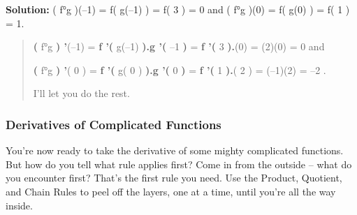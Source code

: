 \textbf{Solution:} ( f°g )(--1) = f( g(--1) ) = f( 3 ) = 0 and ( f°g
)(0) = f( g(0) ) = f( 1 ) = 1.

\begin{quote}
\textbf{(} f°g \textbf{) '}(--1) = \textbf{f '(} g(--1) \textbf{).g '(}
--1 \textbf{)} = \textbf{f '(} 3 \textbf{).}(0) = (2)(0) = 0 and

\textbf{(} f°g \textbf{) '}( 0 ) = \textbf{f '(} g( 0 ) \textbf{).g '(}
0 \textbf{)} = \textbf{f '(} 1 \textbf{).}( 2 ) = (--1)(2) = --2 .

I'll let you do the rest.
\end{quote}

\subsubsection{Derivatives of Complicated
Functions}\label{derivatives-of-complicated-functions}

You're now ready to take the derivative of some mighty complicated
functions. But how do you tell what rule applies first? Come in from the
outside -- what do you encounter first? That's the first rule you need.
Use the Product, Quotient, and Chain Rules to peel off the layers, one
at a time, until you're all the way inside.

\textbf{\\
}

